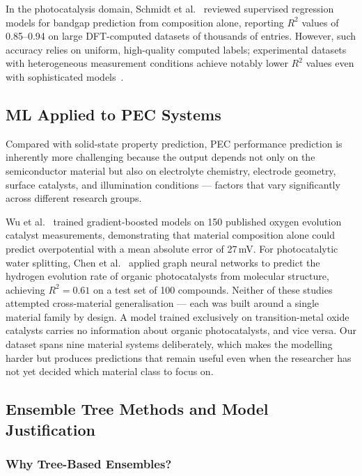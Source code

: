 In the photocatalysis domain, Schmidt et al.~\cite{schmidt2019recent} reviewed
supervised regression models for bandgap prediction from composition alone, reporting
$R^2$ values of 0.85--0.94 on large DFT-computed datasets of thousands of entries.
However, such accuracy relies on uniform, high-quality computed labels; experimental
datasets with heterogeneous measurement conditions achieve notably lower $R^2$
values even with sophisticated models~\cite{goldsmith2018machine}.

\subsection{ML Applied to PEC Systems}

Compared with solid-state property prediction, PEC performance prediction is
inherently more challenging because the output depends not only on the semiconductor
material but also on electrolyte chemistry, electrode geometry, surface catalysts,
and illumination conditions --- factors that vary significantly across different
research groups.

Wu et al.~\cite{wu2019machine} trained gradient-boosted models on 150 published
oxygen evolution catalyst measurements, demonstrating that material composition alone
could predict overpotential with a mean absolute error of 27\,mV.
For photocatalytic water splitting, Chen et al.~\cite{chen2019graph} applied graph
neural networks to predict the hydrogen evolution rate of organic photocatalysts
from molecular structure, achieving $R^2 = 0.61$ on a test set of 100 compounds.
Neither of these studies attempted cross-material generalisation --- each was built
around a single material family by design.
A model trained exclusively on transition-metal oxide catalysts carries no information
about organic photocatalysts, and vice versa.
Our dataset spans nine material systems deliberately, which makes the modelling harder
but produces predictions that remain useful even when the researcher has not yet
decided which material class to focus on.

\subsection{Ensemble Tree Methods and Model Justification}

\subsubsection{Why Tree-Based Ensembles?}

